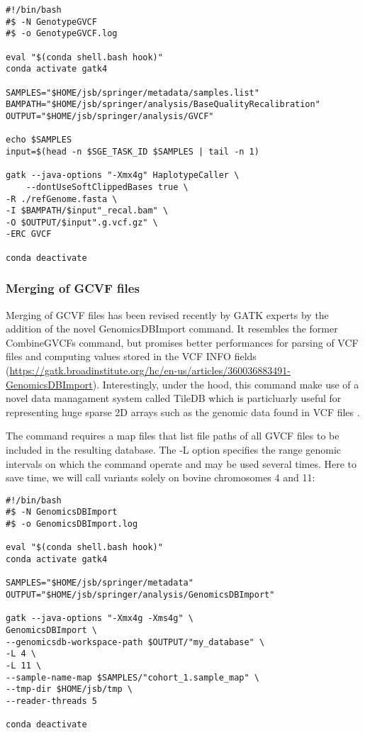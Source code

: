 \begin{verbatim}
#!/bin/bash
#$ -N GenotypeGVCF
#$ -o GenotypeGVCF.log

eval "$(conda shell.bash hook)"
conda activate gatk4

SAMPLES="$HOME/jsb/springer/metadata/samples.list"
BAMPATH="$HOME/jsb/springer/analysis/BaseQualityRecalibration"
OUTPUT="$HOME/jsb/springer/analysis/GVCF"

echo $SAMPLES
input=$(head -n $SGE_TASK_ID $SAMPLES | tail -n 1)

gatk --java-options "-Xmx4g" HaplotypeCaller \
	‐-dontUseSoftClippedBases true \
-R ./refGenome.fasta \
-I $BAMPATH/$input"_recal.bam" \
-O $OUTPUT/$input".g.vcf.gz" \
-ERC GVCF

conda deactivate
\end{verbatim}



\subsubsection{Merging of GCVF files}

Merging of GCVF files has been revised recently by GATK experts by the addition of the novel GenomicsDBImport command. It resembles the former CombineGVCFs command, but promises better performances for parsing of VCF files and computing values stored in the VCF INFO fields (\href{https://gatk.broadinstitute.org/hc/en-us/articles/360036883491-GenomicsDBImport}{https://gatk.broadinstitute.org/hc/en-us/articles/360036883491-GenomicsDBImport}). Interestingly, under the hood, this command make use of a novel data managament system called  TileDB which is particluarly useful for representing huge sparse 2D arrays such as the genomic data found in VCF files \cite{Papadopoulos2016}. 


The command requires a map files that list file paths of all GVCF files to be included in the resulting database. The -L option specifies the range genomic intervals on which the command operate and may be used several times. Here to save time, we will call variants solely on bovine chromosomes 4 and 11:

\begin{verbatim}
#!/bin/bash
#$ -N GenomicsDBImport
#$ -o GenomicsDBImport.log	
	
eval "$(conda shell.bash hook)"
conda activate gatk4

SAMPLES="$HOME/jsb/springer/metadata"
OUTPUT="$HOME/jsb/springer/analysis/GenomicsDBImport"

gatk --java-options "-Xmx4g -Xms4g" \
GenomicsDBImport \
--genomicsdb-workspace-path $OUTPUT/"my_database" \
-L 4 \
-L 11 \
--sample-name-map $SAMPLES/"cohort_1.sample_map" \
--tmp-dir $HOME/jsb/tmp \
--reader-threads 5

conda deactivate

\end{verbatim}


